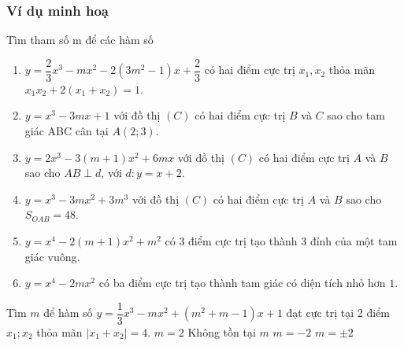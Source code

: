 \subsubsection{Ví dụ minh hoạ}
\begin{vd}%
Tìm tham số m để các hàm số
\begin{enumerate}
	\item $y=\dfrac{2}{3}x^3-mx^2-2(3m^2-1)x+\dfrac{2}{3}$ có hai điểm cực trị $x_1, x_2$ thỏa mãn $x_1x_2+2(x_1+x_2)=1$.
	\item $y=x^3-3mx+1$ với đồ thị $(C)$ có hai điểm cực trị $B$ và $C$ sao cho tam giác ABC cân tại $A(2;3)$.
	\item $y=2x^3-3(m+1)x^2+6mx$ với đồ thị $(C)$ có hai điểm cực trị $A$ và $B$ sao cho $AB\perp d$, với $d\colon y=x+2$.
	\item $y=x^3-3mx^2+3m^3$ với đồ thị $(C)$ có hai điểm cực trị $A$ và $B$ sao cho $S_{OAB}=48$.
	\item $y=x^4-2(m+1)x^2+m^2$ có $3$ điểm cực trị tạo thành $3$ đỉnh của một tam giác vuông.
	\item $y=x^4-2mx^2$ có ba điểm cực trị tạo thành tam giác có diện tích nhỏ hơn $1$.
\end{enumerate}
\end{vd}
\begin{vd}%
Tìm $m$ để hàm số $y=\dfrac{1}{3}x^3-mx^2+\left(m^2+m-1\right)x+1$ đạt cực trị tại 2 điểm $x_1; x_2$ thỏa mãn $|x_1+x_2|=4$. 
\choice
{$m=2$}
{Không tồn tại $m$}
{\True $m=-2$}
{$m=\pm 2$}
\end{vd}

